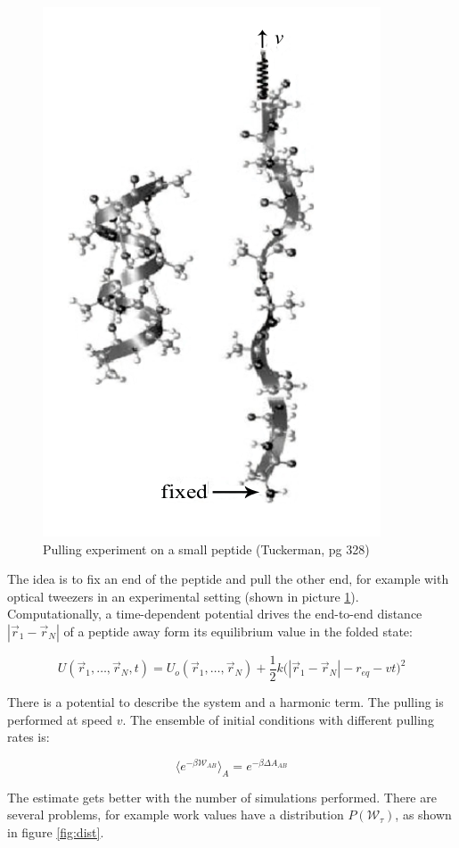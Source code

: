 	\begin{figure}[H]
			\centering
			\includegraphics[scale=0.5]{pulling}
			\caption{Pulling experiment on a small peptide (Tuckerman, pg 328)}
			\label{fig:pulling}
		\end{figure}

	The idea is to fix an end of the peptide and pull the other end, for example with optical tweezers in an experimental setting (shown in picture \ref{fig:pulling}).
	Computationally, a time-dependent potential drives the end-to-end distance $|\vec{r}_1-\vec{r}_N|$ of a peptide away form its equilibrium value in the folded state:

	$$U(\vec{r}_1, \dots, \vec{r}_N, t) = U_o(\vec{r}_1, \dots, \vec{r}_N) + \frac{1}{2}k\bigl(|\vec{r}_1-\vec{r}_N|-r_{eq}-vt\bigr)^2$$

	There is a potential to describe the system and a harmonic term.
	The pulling is performed at speed $v$.
	The ensemble of initial conditions with different pulling rates is:

	$$\langle e^{-\beta\mathcal{W}_{AB}}\rangle_A = e^{-\beta\Delta A_{AB}}$$

	The estimate gets better with the number of simulations performed.
	There are several problems, for example work values have a distribution $P(\mathcal{W}_\tau)$, as shown in figure \ref{fig:dist}.

